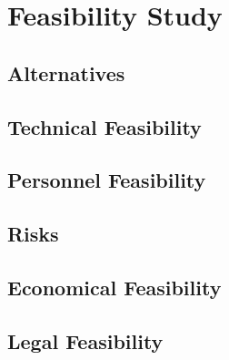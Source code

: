 \chapter{Feasibility Study}
\label{ch:feasibility}

\section{Alternatives}
\section{Technical Feasibility}
\section{Personnel Feasibility}
\section{Risks}
\section{Economical Feasibility}
\section{Legal Feasibility}
